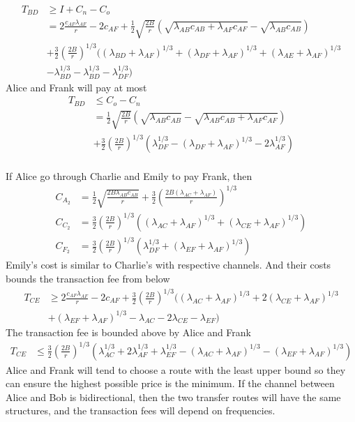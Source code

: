 \documentclass[12pt]{article}
\theoremstyle{plain}
\theoremstyle{remark}
\theoremstyle{definition}
\renewcommand{\geq}{\geqslant}
\renewcommand{\leq}{\leqslant}
\renewcommand{\geq}{\geqslant}
\renewcommand{\leq}{\leqslant}
\begin{document}
\begin{align}
  T_{BD} &\geq I+C_n-C_o \\
  & = 2\frac{c_{AF}\lambda_{AF}}{r}-2c_{AF}+ \frac{1}{2}\sqrt{\frac{2B}{r}}(\sqrt{\lambda_{AB} c_{AB}+\lambda_{AF}c_{AF}}-\sqrt{\lambda_{AB} c_{AB}})\\
  &  + \frac{3}{2}(\frac{2B}{r})^{1/3}((\lambda_{BD}+\lambda_{AF})^{1/3} +(\lambda_{DF}+\lambda_{AF})^{1/3}+(\lambda_{AE}+\lambda_{AF})^{1/3}\\
  & -\lambda_{BD}^{1/3} - \lambda_{BD}^{1/3}-\lambda_{DF}^{1/3})
\end{align}
Alice and Frank will pay at most 
\begin{align}
  T_{BD} & \leq C_{o} - C_{n}\\
   &= \frac{1}{2}\sqrt{\frac{2B}{r}}(\sqrt{\lambda_{AB} c_{AB}}-\sqrt{\lambda_{AB} c_{AB}+\lambda_{AF}c_{AF}}) \\
   & + \frac{3}{2}(\frac{2B}{r})^{1/3}(\lambda_{DF}^{1/3} -(\lambda_{DF}+\lambda_{AF})^{1/3}-2\lambda_{AF}^{1/3})
\end{align}
\\ If Alice go through Charlie and Emily to pay Frank, then 
\begin{align}
  C_{A_2} &= \frac{1}{2}\sqrt{\frac{2B\lambda_{AB} c_{AB}}{r}} + \frac{3}{2}(\frac{2B(\lambda_{AC}+\lambda_{AF})}{r})^{1/3}\\
  C_{C_2} &=  \frac{3}{2}(\frac{2B}{r})^{1/3}((\lambda_{AC}+\lambda_{AF})^{1/3}+(\lambda_{CE}+\lambda_{AF})^{1/3})\\
  C_{F_2} & = \frac{3}{2}(\frac{2B}{r})^{1/3}(\lambda_{DF}^{1/3}+(\lambda_{EF}+\lambda_{AF})^{1/3})
\end{align}
Emily's cost is similar to Charlie's with respective channels. And their costs bounds the transaction fee from below
\begin{align}
  T_{CE} &\geq 2\frac{c_{AF}\lambda_{AF}}{r}-2c_{AF}+ \frac{3}{2}(\frac{2B}{r})^{1/3}((\lambda_{AC}+\lambda_{AF})^{1/3}+2(\lambda_{CE}+\lambda_{AF})^{1/3}\\
  & +(\lambda_{EF}+\lambda_{AF})^{1/3}-\lambda_{AC}-2\lambda_{CE}-\lambda_{EF})
\end{align}
The transaction fee is bounded above by Alice and Frank
\begin{align}
  T_{CE} &\leq \frac{3}{2}(\frac{2B}{r})^{1/3}(\lambda_{AC}^{1/3}+2\lambda_{AF}^{1/3}+\lambda_{EF}^{1/3}-(\lambda_{AC}+\lambda_{AF})^{1/3}-(\lambda_{EF}+\lambda_{AF})^{1/3})
\end{align}
Alice and Frank will tend to choose a route with the least upper bound so they can ensure the highest possible price is the minimum. If the channel between Alice and Bob is bidirectional, then the two transfer routes will have the same structures, and the transaction fees will depend on frequencies. 
\end{document}
